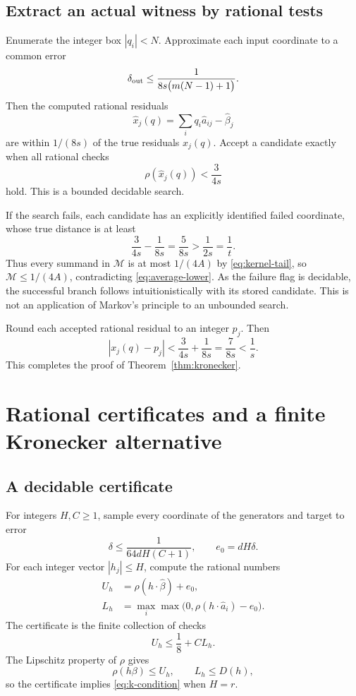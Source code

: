\documentclass[11pt]{article}
\theoremstyle{definition}\newtheorem{definition}[theorem]{Definition}
\theoremstyle{remark}\newtheorem{remark}[theorem]{Remark}
\begin{document}
\subsection{Extract an actual witness by rational tests}

Enumerate the integer box $|q_i|<N$. Approximate each input coordinate to a common error
\begin{equation}\label{eq:output-precision}
 \delta_{\rm out}\le\frac1{8s\bigl(m(N-1)+1\bigr)}.
\end{equation}
Then the computed rational residuals
\[
 \widehat x_j(q)=\sum_iq_i\widehat a_{ij}-\widehat\beta_j
\]
are within $1/(8s)$ of the true residuals $x_j(q)$. Accept a candidate exactly when all rational checks
\begin{equation}\label{eq:accept}
 \rho(\widehat x_j(q))<\frac3{4s}
\end{equation}
hold. This is a bounded decidable search.

If the search fails, each candidate has an explicitly identified failed coordinate, whose true distance is at least
\[
 \frac3{4s}-\frac1{8s}=\frac5{8s}>\frac1{2s}=\frac1t.
\]
Thus every summand in $\mathcal M$ is at most $1/(4A)$ by \eqref{eq:kernel-tail}, so $\mathcal M\le1/(4A)$, contradicting \eqref{eq:average-lower}. As the failure flag is decidable, the successful branch follows intuitionistically with its stored candidate. This is not an application of Markov's principle to an unbounded search.

Round each accepted rational residual to an integer $p_j$. Then
\[
 |x_j(q)-p_j|<\frac3{4s}+\frac1{8s}=\frac7{8s}<\frac1s.
\]
This completes the proof of Theorem~\ref{thm:kronecker}.

\section{Rational certificates and a finite Kronecker alternative}\label{sec:certificates}

\subsection{A decidable certificate}

For integers $H,C\ge1$, sample every coordinate of the generators and target to error
\[
 \delta\le\frac1{64dH(C+1)},\qquad e_0=dH\delta.
\]
For each integer vector $|h_j|\le H$, compute the rational numbers
\begin{align*}
 U_h&=\rho(h\cdot\widehat\beta)+e_0,\\
 L_h&=\max_i\max\bigl(0,\rho(h\cdot\widehat a_i)-e_0\bigr).
\end{align*}
The certificate is the finite collection of checks
\begin{equation}\label{eq:interval-cert}
 U_h\le\frac18+C L_h.
\end{equation}
The Lipschitz property of $\rho$ gives
\[
 \rho(h\beta)\le U_h,\qquad L_h\le D(h),
\]
so the certificate implies \eqref{eq:k-condition} when $H=r$.
\end{document}
